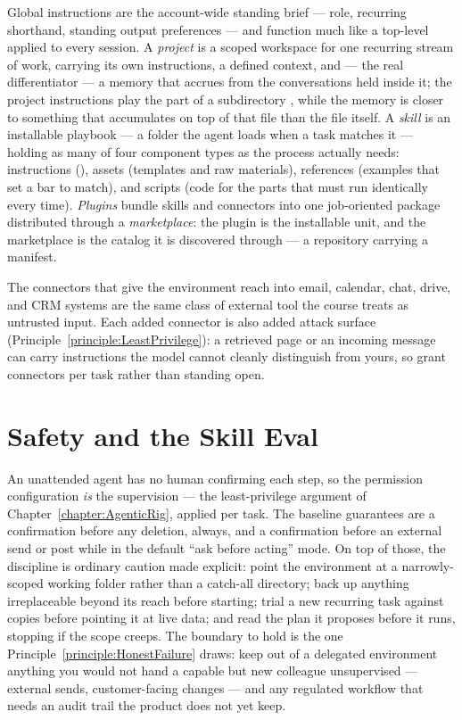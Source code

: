 Global instructions are the account-wide standing brief --- role, recurring shorthand, standing output preferences --- and function much like a top-level  applied to every session.
A \emph{project} is a scoped workspace for one recurring stream of work, carrying its own instructions, a defined context, and --- the real differentiator --- a memory that accrues from the conversations held inside it; the project instructions play the part of a subdirectory , while the memory is closer to something that accumulates on top of that file than the file itself.
A \emph{skill} is an installable playbook --- a folder the agent loads when a task matches it --- holding as many of four component types as the process actually needs: instructions (), assets (templates and raw materials), references (examples that set a bar to match), and scripts (code for the parts that must run identically every time).
\emph{Plugins} bundle skills and connectors into one job-oriented package distributed through a \emph{marketplace}: the plugin is the installable unit, and the marketplace is the catalog it is discovered through --- a repository carrying a  manifest.

The connectors that give the environment reach into email, calendar, chat, drive, and CRM systems are the same class of external tool the course treats as untrusted input.
Each added connector is also added attack surface (Principle~\ref{principle:LeastPrivilege}): a retrieved page or an incoming message can carry instructions the model cannot cleanly distinguish from yours, so grant connectors per task rather than standing open.

\section{Safety and the Skill Eval}

An unattended agent has no human confirming each step, so the permission configuration \emph{is} the supervision --- the least-privilege argument of Chapter~\ref{chapter:AgenticRig}, applied per task.
The baseline guarantees are a confirmation before any deletion, always, and a confirmation before an external send or post while in the default ``ask before acting'' mode.
On top of those, the discipline is ordinary caution made explicit: point the environment at a narrowly-scoped working folder rather than a catch-all directory; back up anything irreplaceable beyond its reach before starting; trial a new recurring task against copies before pointing it at live data; and read the plan it proposes before it runs, stopping if the scope creeps.
The boundary to hold is the one Principle~\ref{principle:HonestFailure} draws: keep out of a delegated environment anything you would not hand a capable but new colleague unsupervised --- external sends, customer-facing changes --- and any regulated workflow that needs an audit trail the product does not yet keep.

